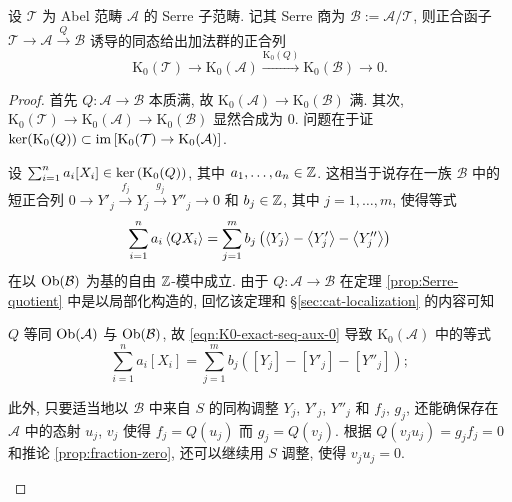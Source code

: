 \begin{proposition}\label{prop:K0-exact-seq}
	设 $\mathcal{T}$ 为 Abel 范畴 $\mathcal{A}$ 的 Serre 子范畴. 记其 Serre 商为 $\mathcal{B} := \mathcal{A}/\mathcal{T}$, 则正合函子 $\mathcal{T} \to \mathcal{A} \xrightarrow{Q} \mathcal{B}$ 诱导的同态给出加法群的正合列
	\[ \mathrm{K}_0(\mathcal{T}) \to \mathrm{K}_0(\mathcal{A}) \xrightarrow{\mathrm{K}_0(Q)} \mathrm{K}_0(\mathcal{B}) \to 0. \]
\end{proposition}
\begin{proof}
	首先 $Q: \mathcal{A} \to \mathcal{B}$ 本质满, 故 $\mathrm{K}_0(\mathcal{A}) \to \mathrm{K}_0(\mathcal{B})$ 满. 其次, $\mathrm{K}_0(\mathcal{T}) \to \mathrm{K}_0(\mathcal{A}) \to \mathrm{K}_0(\mathcal{B})$ 显然合成为 $0$. 问题在于证 $\operatorname{ker}(\mathrm{K_0}(Q)) \subset \operatorname{im}\left[ \mathrm{K}_0(\mathcal{T}) \to \mathrm{K}_0(\mathcal{A}) \right]$.
	
	设 $\sum_{i=1}^n a_i [X_i] \in \operatorname{ker}\left( \mathrm{K}_0(Q)\right)$, 其中 $a_1, \ldots, a_n \in \mathbb{Z}$. 这相当于说存在一族 $\mathcal{B}$ 中的短正合列 $0 \to Y'_j \xrightarrow{f_j} Y_j \xrightarrow{g_j} Y''_j \to 0$ 和 $b_j \in \mathbb{Z}$, 其中 $j=1, \ldots, m$, 使得等式
	\begin{equation}\label{eqn:K0-exact-seq-aux-0}
		\sum_{i=1}^n a_i \left\langle Q X_i \right\rangle = \sum_{j=1}^m b_j \left( \left\langle Y_j \right\rangle - \left\langle Y'_j \right\rangle - \left\langle Y''_j \right\rangle \right)
	\end{equation}
	在以 $\operatorname{Ob}(\mathcal{B})$ 为基的自由 $\mathbb{Z}$-模中成立. 由于 $Q: \mathcal{A} \to \mathcal{B}$ 在定理 \ref{prop:Serre-quotient} 中是以局部化构造的, 回忆该定理和 \S\ref{sec:cat-localization} 的内容可知
	\begin{compactitem}
		\item $Q$ 等同 $\operatorname{Ob}(\mathcal{A})$ 与 $\operatorname{Ob}(\mathcal{B})$, 故 \eqref{eqn:K0-exact-seq-aux-0} 导致 $\mathrm{K}_0(\mathcal{A})$ 中的等式
		\begin{equation}\label{eqn:K0-exact-seq-aux-1}
			\sum_{i=1}^n a_i [X_i] = \sum_{j=1}^m b_j \left( [Y_j] - [Y'_j] - [Y''_j] \right);
		\end{equation}
		\item 此外, 只要适当地以 $\mathcal{B}$ 中来自 $S$ 的同构调整 $Y_j$, $Y'_j$, $Y''_j$ 和 $f_j$, $g_j$, 还能确保存在 $\mathcal{A}$ 中的态射 $u_j$, $v_j$ 使得 $f_j = Q(u_j)$ 而 $g_j = Q(v_j)$. 根据 $Q(v_j u_j) = g_j f_j = 0$ 和推论 \ref{prop:fraction-zero}, 还可以继续用 $S$ 调整, 使得 $v_j u_j = 0$.
	\end{compactitem}


\end{proof}
